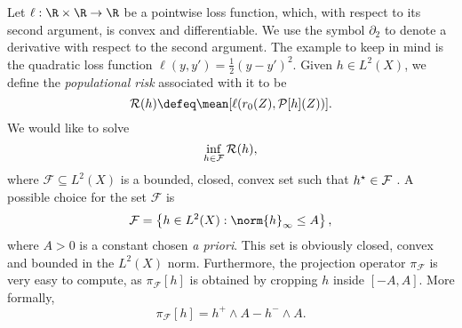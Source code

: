 Let $ \ell : \R \times \R \to \R $ be a pointwise loss function, which, with respect to its second argument, is convex and differentiable.
We use the symbol $ \partial_{ 2 } $ to denote a derivative with respect to the second argument.
The example to keep in mind is the quadratic loss function $ \ell ( y, y' ) = \frac{ 1 }{ 2 } ( y - y' )^2 $.
Given $ h \in L^{ 2 } ( X ) $, we define the \emph{populational risk} associated with it to be
\begin{equation*}
    \risk ( h ) \defeq \mean [ \ell ( r_{ 0 } ( Z ), \meanop [ h ] ( Z ) ) ]
.\end{equation*}
We would like to solve
\begin{equation*}
    \inf_{ h \in \mathcal{F} } \mathcal{R} ( h )
,\end{equation*}
where $ \mathcal{F} \subseteq L^{ 2 } ( X ) $ is a bounded, closed, convex set such that $ h^{ \star } \in \mathcal{F} $ .
A possible choice for the set $ \mathcal{F} $ is
\begin{equation*}
    \mathcal{F} = \left\{ h \in L^{ 2 } ( X ) : \norm{ h }_{ \infty } \leq A \right\}
,\end{equation*}
where $ A > 0 $ is a constant chosen \emph{a priori}.
This set is obviously closed, convex and bounded in the $ L^2 ( X ) $ norm.
Furthermore, the projection operator $ \pi_{ \mathcal{F} } $ is very easy to compute, as $ \pi_{ \mathcal{F} } [ h ] $ is obtained by cropping $ h $ inside $ [ -A, A ] $.
More formally,
\begin{equation*}
    \pi_{ \mathcal{F} } [ h ] = h^{ + } \wedge A - h^{ - } \wedge A
.\end{equation*}


